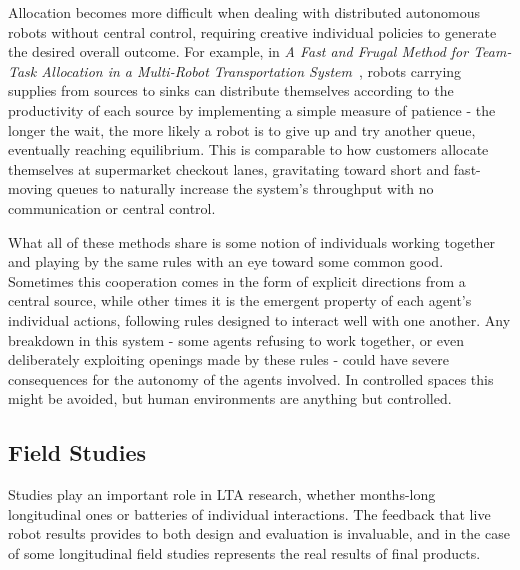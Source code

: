 \documentclass{sfuthesis}
\begin{document}
Allocation becomes more difficult when dealing with distributed autonomous robots without central control, requiring creative individual policies to generate the desired overall outcome. For example, in \textit{A Fast and Frugal Method for Team-Task Allocation in a Multi-Robot Transportation System}~\cite{wawerla2010fast}, robots carrying supplies from sources to sinks can distribute themselves according to the productivity of each source by implementing a simple measure of patience - the longer the wait, the more likely a robot is to give up and try another queue, eventually reaching equilibrium. This is comparable to how customers allocate themselves at supermarket checkout lanes, gravitating toward short and fast-moving queues to naturally increase the system's throughput with no communication or central control.

What all of these methods share is some notion of individuals working together and playing by the same rules with an eye toward some common good. Sometimes this cooperation comes in the form of explicit directions from a central source, while other times it is the emergent property of each agent's individual actions, following rules designed to interact well with one another. Any breakdown in this system - some agents refusing to work together, or even deliberately exploiting openings made by these rules - could have severe consequences for the autonomy of the agents involved. In controlled spaces this might be avoided, but human environments are anything but controlled.







\subsection{Field Studies}

Studies play an important role in LTA research, whether months-long longitudinal ones or batteries of individual interactions. The feedback that live robot results provides to both design and evaluation is invaluable, and in the case of some longitudinal field studies represents the real results of final products.
\end{document}
